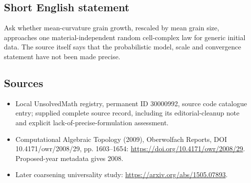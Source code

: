 \documentclass[11pt]{article}
\begin{document}
\subsection{Short English statement}
Ask whether mean-curvature grain growth, rescaled by mean grain size, approaches one material-independent random cell-complex law for generic initial data. The source itself says that the probabilistic model, scale and convergence statement have not been made precise.
\subsection{Sources}
\begin{itemize}
\item Local UnsolvedMath registry, permanent ID 30000992, source code catalogue entry; supplied complete source record, including its editorial-cleanup note and explicit lack-of-precise-formulation assessment.
\item Computational Algebraic Topology (2009), Oberwolfach Reports, DOI 10.4171/owr/2008/29, pp. 1603--1654: \url{https://doi.org/10.4171/owr/2008/29}. Proposed-year metadata gives 2008.
\item Later coarsening universality study: \url{https://arxiv.org/abs/1505.07893}.
\end{itemize}
\end{document}
